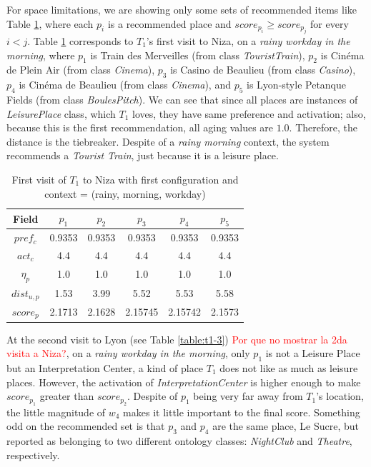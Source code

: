 For space limitations, we are showing only some sets of recommended items like Table \ref{table:t1-1}, where each $p_i$ is a recommended place and $score_{p_i} \ge score_{p_j}$ for every $i < j$. Table \ref{table:t1-1} corresponds to $T_1$'s first visit to Niza, on a {\it rainy workday in the morning}, where $p_1$ is Train des Merveilles (from class \textit{TouristTrain}), $p_2$ is Cinéma de Plein Air (from class \textit{Cinema}), $p_3$ is Casino de Beaulieu (from class \textit{Casino}), $p_4$ is Cinéma de Beaulieu (from class \textit{Cinema}), and $p_5$ is Lyon-style Petanque Fields (from class \textit{BoulesPitch}). We can see that since all places
are instances
of \textit{LeisurePlace} class, which $T_1$ loves, they have same preference and activation; also, because
this is the first recommendation, all aging values are $1.0$. Therefore, the distance is the tiebreaker. Despite of a {\it rainy morning} context, the system recommends a {\it Tourist Train}, 
just because it is a leisure place.
\begin{table}[h!]
    \centering
        \caption{First visit of $T_1$ to Niza with first configuration and context = (rainy, morning, workday)}
    \label{table:t1-1}
    \begin{tabular}{ |c|c|c|c|c|c| } 
        \hline
        Field   & $p_1$ & $p_2$ & $p_3$ & $p_4$ & $p_5$ \\
        \hline
        $pref_c$    &  0.9353 & 0.9353 & 0.9353 & 0.9353 & 0.9353 \\
        $act_c$     & 4.4 & 4.4 & 4.4 & 4.4 & 4.4 \\
        $\eta_p$    & 1.0 & 1.0 & 1.0 & 1.0 & 1.0 \\
        $dist_{u,p}$ & 1.53 & 3.99 & 5.52 & 5.53 & 5.58 \\
        $score_p$    & 2.1713 & 2.1628 & 2.15745 & 2.15742 & 2.1573 \\
        
        \hline
    \end{tabular}
\end{table}


At the second visit to Lyon (see Table \ref{table:t1-3}) \textcolor{red}{Por que no mostrar la 2da visita a Niza?}, on a {\it rainy workday in the morning}, only $p_1$ is not a Leisure Place but an Interpretation Center, a kind of place $T_1$ does not like as much as leisure places. However, the activation of \textit{InterpretationCenter} is higher enough to make $score_{p_1}$ greater than $score_{p_2}$. Despite of $p_1$ being very far away from $T_1$'s location, the little magnitude of $w_4$ makes it little important to the final score. Something odd on the recommended set is that $p_3$ and $p_4$ are the same place, Le Sucre, but reported as belonging to two different ontology classes: \textit{NightClub} and \textit{Theatre}, respectively.

